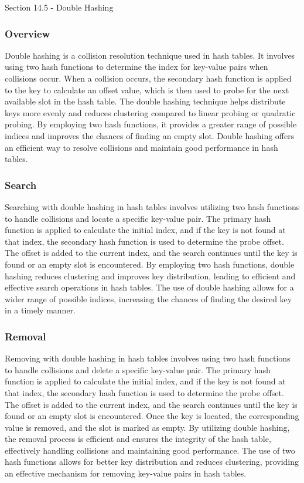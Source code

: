 \begin{notes}{Section 14.5 - Double Hashing}
    \subsubsection*{Overview}

    Double hashing is a collision resolution technique used in hash tables. It involves using two hash functions to determine the index for key-value pairs when collisions occur. When a collision occurs, 
    the secondary hash function is applied to the key to calculate an offset value, which is then used to probe for the next available slot in the hash table. The double hashing technique helps distribute 
    keys more evenly and reduces clustering compared to linear probing or quadratic probing. By employing two hash functions, it provides a greater range of possible indices and improves the chances of 
    finding an empty slot. Double hashing offers an efficient way to resolve collisions and maintain good performance in hash tables.
    
    \subsubsection*{Search}
    
    Searching with double hashing in hash tables involves utilizing two hash functions to handle collisions and locate a specific key-value pair. The primary hash function is applied to calculate the initial 
    index, and if the key is not found at that index, the secondary hash function is used to determine the probe offset. The offset is added to the current index, and the search continues until the key is 
    found or an empty slot is encountered. By employing two hash functions, double hashing reduces clustering and improves key distribution, leading to efficient and effective search operations in hash tables. 
    The use of double hashing allows for a wider range of possible indices, increasing the chances of finding the desired key in a timely manner.
    
    \subsubsection*{Removal}
    
    Removing with double hashing in hash tables involves using two hash functions to handle collisions and delete a specific key-value pair. The primary hash function is applied to calculate the initial index, 
    and if the key is not found at that index, the secondary hash function is used to determine the probe offset. The offset is added to the current index, and the search continues until the key is found or an 
    empty slot is encountered. Once the key is located, the corresponding value is removed, and the slot is marked as empty. By utilizing double hashing, the removal process is efficient and ensures the integrity 
    of the hash table, effectively handling collisions and maintaining good performance. The use of two hash functions allows for better key distribution and reduces clustering, providing an effective mechanism 
    for removing key-value pairs in hash tables.
    

\end{notes}
